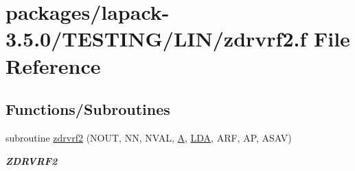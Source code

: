 \hypertarget{zdrvrf2_8f}{}\section{packages/lapack-\/3.5.0/\+T\+E\+S\+T\+I\+N\+G/\+L\+I\+N/zdrvrf2.f File Reference}
\label{zdrvrf2_8f}
\subsection*{Functions/\+Subroutines}
\begin{DoxyCompactItemize}
\item 
subroutine \hyperlink{group__complex16__lin_gaceac78f76cffa751021745ead52af790}{zdrvrf2} (N\+O\+U\+T, N\+N, N\+V\+A\+L, \hyperlink{classA}{A}, \hyperlink{example__user_8c_ae946da542ce0db94dced19b2ecefd1aa}{L\+D\+A}, A\+R\+F, A\+P, A\+S\+A\+V)
\begin{DoxyCompactList}\small\item\em {\bfseries Z\+D\+R\+V\+R\+F2} \end{DoxyCompactList}\end{DoxyCompactItemize}
